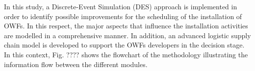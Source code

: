 In this study, a Discrete-Event Simulation (DES) approach is implemented in order to identify possible improvements for the scheduling of the installation of OWFs. In this respect, the major aspects that influence the installation activities are modelled in a comprehensive manner. In addition, an advanced logistic supply chain model is developed to support the OWFs developers in the decision stage. In this context, Fig. ???? shows the flowchart of the methodology illustrating the information flow between the different modules.
